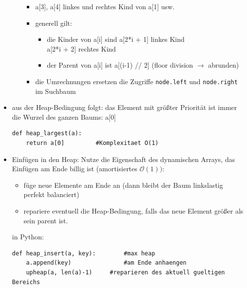 \documentclass[11pt, fleqn]{scrreprt}
\newcommand{\bigO}[0]{\mathcal{O}}
\begin{document}
\begin{itemize}
\begin{itemize}
\begin{itemize}
                \item a[3], a[4] linkes und rechtes Kind von a[1] usw.
                \item generell gilt:
                \begin{itemize}
                    \item die Kinder von a[i] sind a[2*i + 1] linkes Kind \\
                    \hspace*{8cm} a[2*i + 2] rechtes Kind
                    \item der Parent von a[i] ist a[(i-1) // 2] (floor division $\rightarrow$ abrunden)
                \end{itemize}
                \item die Umrechnungen ersetzen die Zugriffe \verb|node.left| und \verb|node.right| im Suchbaum
            \end{itemize}
        \end{itemize}
        \item aus der Heap-Bedingung folgt: das Element mit größter Priorität ist immer die Wurzel des ganzen Baums: a[0]
        \begin{verbatim}
def heap_largest(a):
    return a[0]         #Komplexitaet O(1)
        \end{verbatim}
        \item Einfügen in den Heap: Nutze die Eigenschaft des dynamischen Arrays, das Einfügen am Ende billig ist (amortisiertes $\bigO{}(1))$:
        \begin{itemize}
            \item füge neue Elemente am Ende an (dann bleibt der Baum linkslastig perfekt balanciert)
            \item repariere eventuell die Heap-Bedingung, falls das neue Element größer als sein parent ist.
        \end{itemize}
        in Python:
        \begin{verbatim}
def heap_insert(a, key):        #max heap
    a.append(key)               #am Ende anhaengen
    upheap(a, len(a)-1)     #reparieren des aktuell gueltigen Bereichs


\end{verbatim}
\end{itemize}
\end{document}
